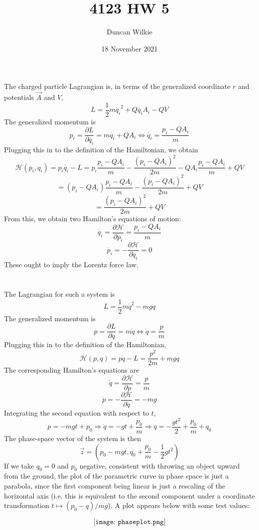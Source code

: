\documentclass{article}
\title{4123 HW 5}
\author{Duncan Wilkie}
\date{18 November 2021}
\begin{document}
\maketitle

\section{}
The charged particle Lagrangian is, in terms of the generalized coordinate $r$ and potentials $\vec{A}$ and $V$,
\[L=\frac{1}{2}m\dot{q_i}^2+Q\dot{q_i}A_i-QV\]
The generalized momentum is
\[p_i=\frac{\partial L}{\partial\dot{q_i}}=m\dot{q_i}+QA_i\Leftrightarrow \dot{q_i}={\frac{p_i-QA_i}{m}}\]
Plugging this in to the definition of the Hamiltonian, we obtain
\[\mathcal{H}(p_i,q_i)=p_i\dot{q_i}-L=p_i{\frac{p_i-QA_i}{m}}- {\frac{(p_i-QA_i)^2}{2m}}-QA_i{\frac{p_i-QA_i}{m}}+QV\]
\[=(p_i-QA_i)\frac{p_i-QA_i}{m}-\frac{(p_i-QA_i)^2}{2m}+QV\]
\[=\frac{(p_i-QA_i)^2}{2m}+QV\]
From this, we obtain two Hamilton's equations of motion:
\[\dot{q_i}=\frac{\partial\mathcal{H}}{\partial p_i}=\frac{p_i-QA_i}{m}\]
\[\dot{p_i}=-\frac{\partial \mathcal{H}}{\partial q_i}=0\]
These ought to imply the Lorentz force law.

\section{}
The Lagrangian for such a system is
\[L=\frac{1}{2}m\dot{q}^2-mgq\]
The generalized momentum is
\[p=\frac{\partial L}{\partial \dot{q}}=m\dot{q}\Leftrightarrow \dot{q}=\frac{p}{m}\]
Plugging this in to the definition of the Hamiltonian,
\[\mathcal{H}(p,q)=p\dot{q}-L=\frac{p^2}{2m}+mgq\]
The corresponding Hamilton's equations are
\[\dot{q}=\frac{\partial \mathcal{H}}{\partial p}=\frac{p}{m}\]
\[\dot{p}=-\frac{\partial\mathcal{H}}{\partial q}=-mg\]
Integrating the second equation with respect to $t$,
\[p=-mgt+p_0\Rightarrow \dot{q}=-gt+\frac{p_0}{m}\Rightarrow q=-\frac{gt^2}{2}+\frac{p_0}{m}+q_0\]
The phase-space vector of the system is then
\[\vec{z}=\left(p_0-mgt, q_0+\frac{p_0}{m}-\frac{1}{2}gt^2\right)\]
If we take $q_0=0$ and $p_0$ negative, consistent with throwing an object upward from the ground, the plot of the parametric curve in phase space is just a parabola, since the first component being linear is just a rescaling of the horizontal axis (i.e. this is equivalent to the second component under a coordinate transformation $t\mapsto (p_0-q)/mg$). A plot appears below with some test values:

\[\texttt{[image: phaseplot.png]}\]
\end{document}
